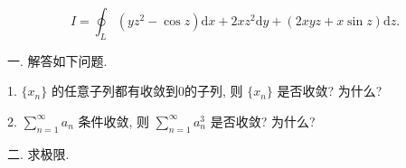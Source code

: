 \documentclass{examcollection}
\renewcommand{\displayformula}[1]{\[#1\]}
\begin{document}
{\begin{minipage}{\textwidth}
\displayformula{I = \oint_ {L} (y z ^ {2} - \cos z) \mathrm{d} x + 2 x z ^ {2} \mathrm{d} y + (2 x y z + x \sin z) \mathrm{d} z.}\par
{}\smallskip
一. 解答如下问题.\par
1. $\{x_{n}\}$ 的任意子列都有收敛到0的子列, 则 $\{x_{n}\}$ 是否收敛? 为什么?\par
2. $\sum_{n=1}^{\infty} a_n$ 条件收敛, 则 $\sum_{n=1}^{\infty} a_n^3$ 是否收敛? 为什么?\par
二. 求极限.\par
\end{minipage}}
\ifdim\dimexpr\ht\proofbox+\dp\proofbox\relax>\textheight
\noindent\resizebox{!}{\textheight}{\usebox{\proofbox}}\else\noindent\usebox{\proofbox}\fi\clearpage
\end{document}
